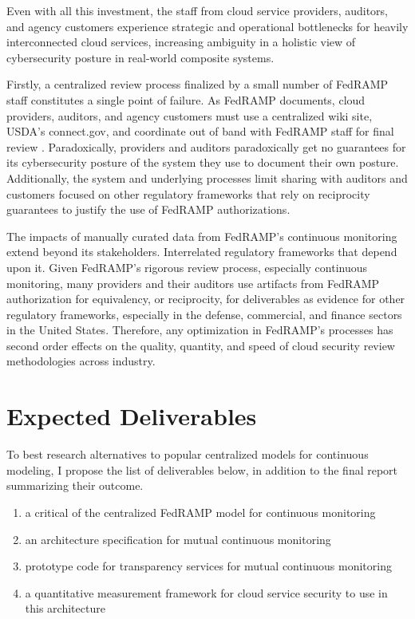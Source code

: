 \documentclass{jdf}
\begin{document}
Even with all this investment, the staff from cloud service providers, auditors, and agency customers experience strategic and operational bottlenecks for heavily interconnected cloud services, increasing ambiguity in a holistic view of cybersecurity posture in real-world composite systems. 

Firstly, a centralized review process finalized by a small number of FedRAMP staff constitutes a single point of failure. As FedRAMP documents, cloud providers, auditors, and agency customers must use a centralized wiki site, USDA's connect.gov, and coordinate out of band with FedRAMP staff for final review \citeyear[pp.~3,14]{fedramp_auth_playbook25}. Paradoxically, providers and auditors paradoxically get no guarantees for its cybersecurity posture of the system they use to document their own posture. Additionally, the system and underlying processes limit sharing with auditors and customers focused on other regulatory frameworks that rely on reciprocity guarantees to justify the use of FedRAMP authorizations.

The impacts of manually curated data from FedRAMP's continuous monitoring extend beyond its stakeholders. Interrelated regulatory frameworks that depend upon it. Given FedRAMP's rigorous review process, especially continuous monitoring, many providers and their auditors use artifacts from FedRAMP authorization for equivalency, or reciprocity, for deliverables as evidence for other regulatory frameworks, especially in the defense, commercial, and finance sectors in the United States. Therefore, any optimization in FedRAMP's processes has second order effects on the quality, quantity, and speed of cloud security review methodologies across industry.

\section{Expected Deliverables}

To best research alternatives to popular centralized models for continuous modeling, I propose the list of deliverables below, in addition to the final report summarizing their outcome. 

\begin{enumerate}
    \item a critical of the centralized FedRAMP model for continuous monitoring
    \item an architecture specification for mutual continuous monitoring
    \item prototype code for transparency services for mutual continuous monitoring
    \item a quantitative measurement framework for cloud service security to use in this architecture
\end{enumerate}



\end{document}
